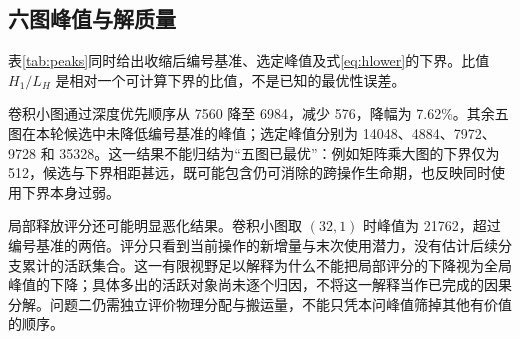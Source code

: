 \subsection{六图峰值与解质量}
表\ref{tab:peaks}同时给出收缩后编号基准、选定峰值及式\eqref{eq:hlower}的下界。比值 $H_1/L_H$ 是相对一个可计算下界的比值，不是已知的最优性误差。
\begin{table}[H]\centering\caption{驻留峰值与同时使用下界（题面容量单位）}\label{tab:peaks}\small
\end{table}

卷积小图通过深度优先顺序从 7560 降至 6984，减少 576，降幅为 7.62\%。其余五图在本轮候选中未降低编号基准的峰值；选定峰值分别为 14048、4884、7972、9728 和 35328。这一结果不能归结为“五图已最优”：例如矩阵乘大图的下界仅为 512，候选与下界相距甚远，既可能包含仍可消除的跨操作生命期，也反映同时使用下界本身过弱。

局部释放评分还可能明显恶化结果。卷积小图取 $(32,1)$ 时峰值为 21762，超过编号基准的两倍。评分只看到当前操作的新增量与末次使用潜力，没有估计后续分支累计的活跃集合。这一有限视野足以解释为什么不能把局部评分的下降视为全局峰值的下降；具体多出的活跃对象尚未逐个归因，不将这一解释当作已完成的因果分解。问题二仍需独立评价物理分配与搬运量，不能只凭本问峰值筛掉其他有价值的顺序。

